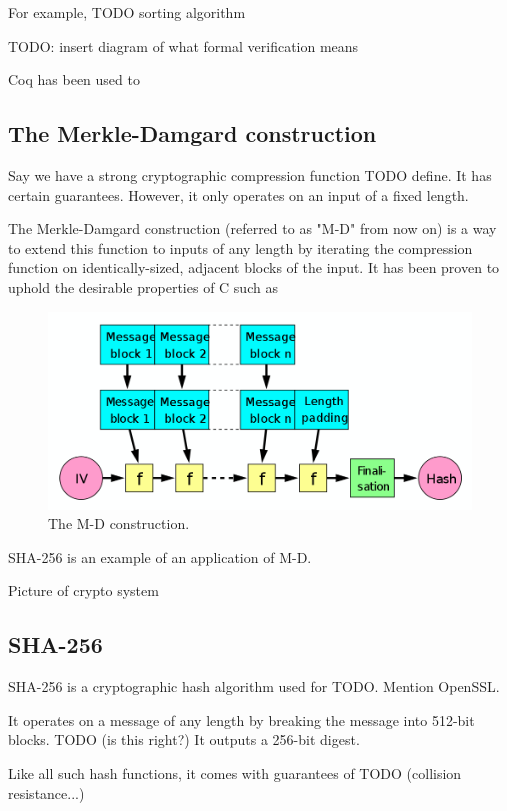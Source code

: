 \documentclass[twocolumn,showpacs,%
  nofootinbib,aps,superscriptaddress,%
  eqsecnum,prd,notitlepage,showkeys,10pt]{revtex4-1}
\begin{document}
For example, TODO sorting algorithm

TODO: insert diagram of what formal verification means

Coq has been used to

\subsection{The Merkle-Damgard construction}
Say we have a strong cryptographic compression function TODO define. It has certain guarantees. However, it only operates on an input of a fixed length.

The Merkle-Damgard construction (referred to as "M-D" from now on) is a way to extend this function to inputs of any length by iterating the compression function on identically-sized, adjacent blocks of the input. It has been proven to uphold the desirable properties of C such as

\begin{figure}[h!]
	\centering
	\includegraphics[scale=0.24]{Merkle-Damgard}
	\caption{The M-D construction.}
\end{figure}

SHA-256 is an example of an application of M-D.

Picture of crypto system 

\subsection{SHA-256}

SHA-256 is a cryptographic hash algorithm used for TODO. Mention OpenSSL.

It operates on a message of any length by breaking the message into 512-bit blocks. TODO (is this right?) It outputs a 256-bit digest. 

Like all such hash functions, it comes with guarantees of TODO (collision resistance...)
\end{document}
